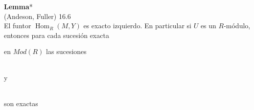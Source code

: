 \documentclass{article}
\begin{document}
\begin{enumerate}[label=\textbf{Ej \arabic*.}]
\textbf{Lemma}*\\
(Andeson, Fuller) 16.6\\
El funtor $\operatorname{Hom}_R(M,Y)$ es exacto izquierdo. En particular si $U$ es un $R$-módulo, entonces para cada sucesión exacta 
en $Mod(R)$ las sucesiones 
\\
y \,\,
\\
son exactas\\


\end{enumerate}
\end{document}
